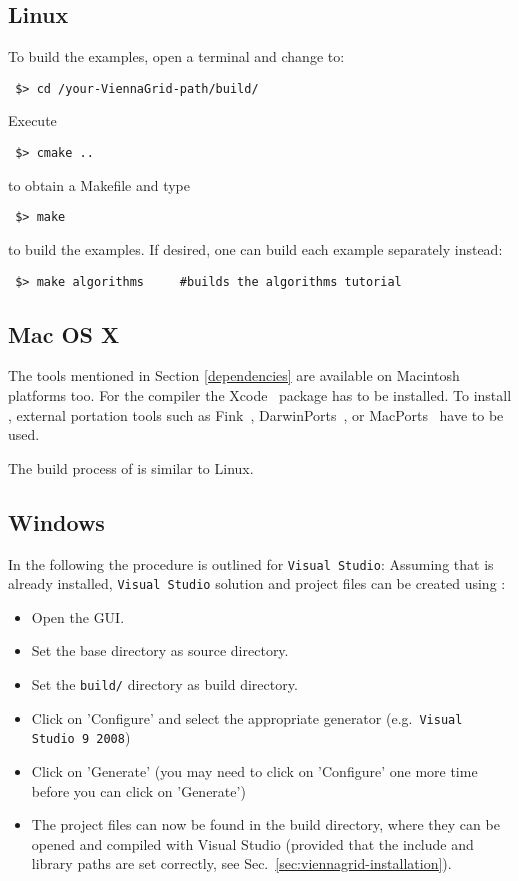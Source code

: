 \subsection{Linux}
To build the examples, open a terminal and change to:

\begin{lstlisting}
 $> cd /your-ViennaGrid-path/build/
\end{lstlisting}
Execute
\begin{lstlisting}
 $> cmake ..
\end{lstlisting}
to obtain a Makefile and type
\begin{lstlisting}
 $> make 
\end{lstlisting}
to build the examples. If desired, one can build each example separately instead:
\begin{lstlisting}
 $> make algorithms     #builds the algorithms tutorial
\end{lstlisting}


\subsection{Mac OS X}
\label{apple}
The tools mentioned in Section \ref{dependencies} are available on 
Macintosh platforms too. 
For the {\GCC} compiler the Xcode~\cite{xcode} package has to be installed.
To install {\CMake}, external portation tools such as
Fink~\cite{fink}, DarwinPorts~\cite{darwinports}, 
or MacPorts~\cite{macports} have to be used. 

The build process of {\ViennaGrid} is similar to Linux.

\subsection{Windows}
In the following the procedure is outlined for \texttt{Visual Studio}: Assuming
that {\CMake} is already installed, \texttt{Visual Studio} solution
and project files can be created using {\CMake}:
\begin{itemize}
\item Open the {\CMake} GUI.
\item Set the {\ViennaGrid} base directory as source directory.
\item Set the \texttt{build/} directory as build directory.
\item Click on 'Configure' and select the appropriate generator
(e.g.~\texttt{Visual Studio 9 2008})
\item Click on 'Generate' (you may need to click on 'Configure' one more time
before you can click on 'Generate')
\item The project files can now be found in the {\ViennaGrid} build directory,
where they can be opened and compiled with Visual Studio (provided that the
include and library paths are set correctly, see
Sec.~\ref{sec:viennagrid-installation}).
\end{itemize}

